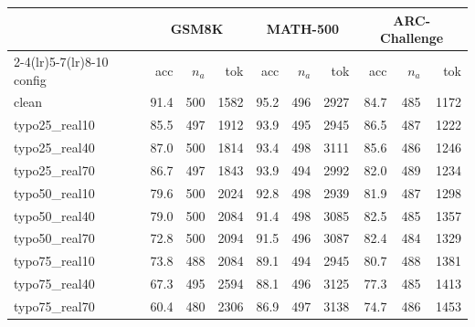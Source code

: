 \begin{tabular}{l rrr rrr rrr}
\toprule
 & \multicolumn{3}{c}{GSM8K} & \multicolumn{3}{c}{MATH-500} & \multicolumn{3}{c}{ARC-Challenge} \\
\cmidrule(lr){2-4}\cmidrule(lr){5-7}\cmidrule(lr){8-10}
config & acc & $n_a$ & tok & acc & $n_a$ & tok & acc & $n_a$ & tok \\
\midrule
clean & 91.4 & 500 & 1582 & 95.2 & 496 & 2927 & 84.7 & 485 & 1172 \\
typo25\_real10 & 85.5 & 497 & 1912 & 93.9 & 495 & 2945 & 86.5 & 487 & 1222 \\
typo25\_real40 & 87.0 & 500 & 1814 & 93.4 & 498 & 3111 & 85.6 & 486 & 1246 \\
typo25\_real70 & 86.7 & 497 & 1843 & 93.9 & 494 & 2992 & 82.0 & 489 & 1234 \\
typo50\_real10 & 79.6 & 500 & 2024 & 92.8 & 498 & 2939 & 81.9 & 487 & 1298 \\
typo50\_real40 & 79.0 & 500 & 2084 & 91.4 & 498 & 3085 & 82.5 & 485 & 1357 \\
typo50\_real70 & 72.8 & 500 & 2094 & 91.5 & 496 & 3087 & 82.4 & 484 & 1329 \\
typo75\_real10 & 73.8 & 488 & 2084 & 89.1 & 494 & 2945 & 80.7 & 488 & 1381 \\
typo75\_real40 & 67.3 & 495 & 2594 & 88.1 & 496 & 3125 & 77.3 & 485 & 1413 \\
typo75\_real70 & 60.4 & 480 & 2306 & 86.9 & 497 & 3138 & 74.7 & 486 & 1453 \\
\bottomrule
\end{tabular}
